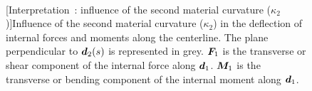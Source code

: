 \begin{figure}[p]
  \begin{leftfullpage}
    \captionsetup[subfloat]{captionskip=10pt}
     	\centering
     	 \\
	\vspace{30pt}
	\vspace{30pt}
	[Interpretation~: influence of the second material curvature ($\kappa_2$)]{Influence of the second material curvature ($\kappa_2$) in the deflection of internal forces and moments along the centerline. The plane perpendicular to $\boldsymbol{d}_2(s)$ is represented in grey. $\boldsymbol{F}_1$ is the transverse or shear component of the internal force along $\boldsymbol{d}_1$. $\boldsymbol{M}_1$ is the transverse or bending component of the internal moment along $\boldsymbol{d}_1$.}     
	\label{fig:d2}
 \end{leftfullpage}
\end{figure}
